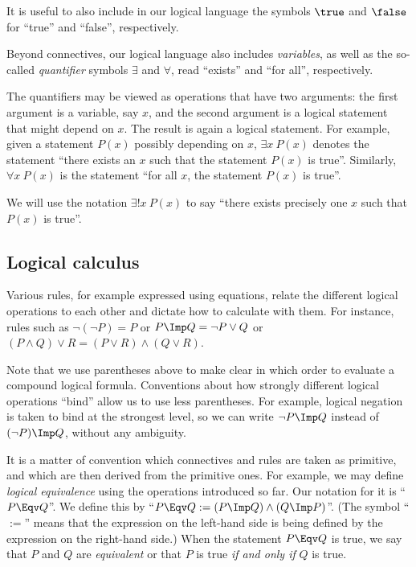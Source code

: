 It is useful to also include in our logical language the symbols $\true$ and $\false$ for ``true'' and ``false'', respectively. 


Beyond connectives, our logical language also includes \emph{variables}, as well as the so-called \emph{quantifier} symbols $\exists$ and $\forall$, read ``exists'' and ``for all'', respectively. 

The quantifiers may be viewed as operations that have two arguments: the first argument is a variable, say $x$, and the second argument is a logical statement that might depend on $x$. The result is again a logical statement. For example, given a statement $P(x)$ possibly depending on $x$, $\exists x \ P(x)$ denotes the statement ``there exists an $x$ such that the statement $P(x)$ is true''. Similarly, $\forall x \ P(x)$ is the statement ``for all $x$, the statement $P(x)$ is true''. 

We will use the notation $\exists! x \ P(x)$ to say ``there exists precisely one $x$ such that $P(x)$ is true''. 


\subsection{Logical calculus}

Various rules, for example expressed using equations, relate the different logical operations to each other and dictate how to calculate with them. For instance, rules such as $\lnot (\lnot P) = P$ or $P \Imp Q = \lnot P \vee Q$ or $(P \wedge Q) \vee R = (P \vee R) \wedge (Q \vee R)$. 

Note that we use parentheses above to make clear in which order to evaluate a compound logical formula. Conventions about how strongly different logical operations ``bind'' allow us to use less parentheses. For example, logical negation is taken to bind at the strongest level, so we can write $\lnot P \Imp Q$ instead of $(\lnot P) \Imp Q$, without any ambiguity. 

It is a matter of convention which connectives and rules are taken as primitive, and which are then derived from the primitive ones. For example, we may define \emph{logical equivalence} using the operations introduced so far. Our notation for it is ``$P \Eqv Q$''. We define this by ``$P \Eqv Q := (P \Imp Q) \wedge (Q \Imp P)$''. (The symbol ``$:=$'' means that the expression on the left-hand side is being defined by the expression on the right-hand side.) When the statement $P \Eqv Q$ is true, we say that $P$ and $Q$ are \emph{equivalent} or that $P$ is true \emph{if and only if} $Q$ is true. 


